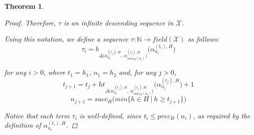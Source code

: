 \documentclass{amsart}
\newcommand\Nat{\mathbb{N}}
\newcommand{\LoX}{\mathcal{X}}
\newtheorem{theorem}{Theorem}
\begin{document}
\begin{theorem}
\begin{proof}
Therefore, $\tau$ is an infinite descending sequence in $\LoX$.
















































\iffalse

Using this notation, we define a sequence $\tau : \Nat \rightarrow field(\LoX)$ as follows:
\begin{equation*}
    \tau_i = b_{\Delta\big(\alpha_{n_i}^{(t_j),H},\ \alpha_{succ_H(n_i)}^{(t_j),H}\big)}\big(\alpha_{n_i}^{(t_i),H}\big)
\end{equation*}

for any $i>0$, where $t_1=h_1$, $n_1=h_2$ and, for any $j>0$,
\begin{equation*}
    t_{j+1} = t_j + ht_{\Delta\big(\alpha_{n_i}^{(t_j),H},\ \alpha_{succ_H(n_i)}^{(t_j),H}\big)}\big(\alpha_{n_j}^{(t_j),H}\big) + 1
\end{equation*}
\begin{equation*}
    n_{j+1} = succ_H \big(min \big\{ h \in H \ \big|\ h \geq t_{j+1} \big\}\big)
\end{equation*}

\medskip

Notice that each term $\tau_i$ is well-defined, since $t_i \leq prec_H(n_i)$, as required by the definition of $\alpha_{n_i}^{(t_i),H}$.


\end{proof}
\end{theorem}
\end{document}
